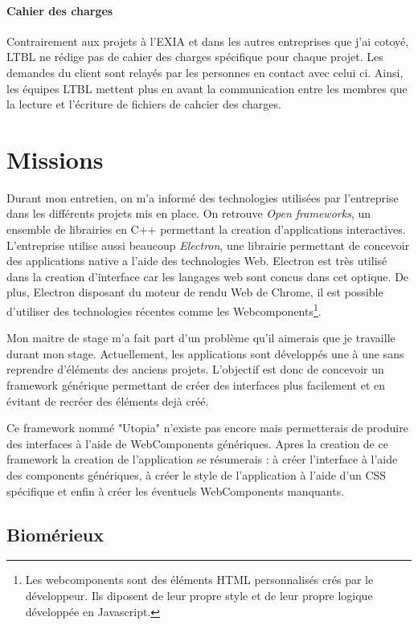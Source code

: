 \documentclass{article}
\begin{document}
\paragraph{Cahier des charges} Contrairement aux projets à l'EXIA et dans les autres entreprises que j'ai cotoyé, LTBL ne rédige pas de cahier des charges spécifique pour chaque projet.
Les demandes du client sont relayés par les personnes en contact avec celui ci.
Ainsi, les équipes LTBL mettent plus en avant la communication entre les membres que la lecture et l'écriture de fichiers de cahcier des charges.

\section{Missions}

Durant mon entretien, on m'a informé des technologies utilisées par l'entreprise dans les différents projets mis en place.
On retrouve \emph{Open frameworks}, un ensemble de librairies en C++ permettant la creation d'applications interactives.
L'entreprise utilise aussi beaucoup \emph{Electron}, une librairie permettant de concevoir des applications native a l'aide des technologies Web.
Electron est très utilisé dans la creation d'interface car les langages web sont concus dans cet optique.
De plus, Electron disposant du moteur de rendu Web de Chrome, il est possible d'utiliser des technologies récentes comme les Webcomponents\footnote{Les webcomponents sont des éléments HTML personnalisés crés par le développeur. Ils diposent de leur propre style et de leur propre logique développée en Javascript.}.

Mon maitre de stage m'a fait part d'un problème qu'il aimerais que je travaille durant mon stage.
Actuellement, les applications sont développés une à une sans reprendre d'éléments des anciens projets.
L'objectif est donc de concevoir un framework générique permettant de créer des interfaces plus facilement et en évitant de recréer des éléments dejà créé.

Ce framework nommé "Utopia" n'existe pas encore mais permetterais de produire des interfaces à l'aide de WebComponents génériques.
Apres la creation de ce framework la creation de l'application se résumerais : à créer l'interface à l'aide des components génériques, à créer le style de l'application à l'aide d'un CSS spécifique et enfin à créer les éventuels WebComponents manquants.

\subsection{Biomérieux}
\end{document}
